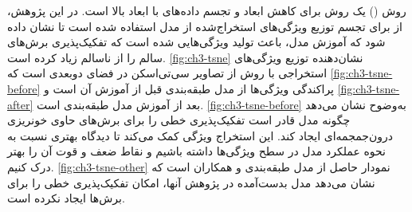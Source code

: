 روش
  ()
  یک روش برای کاهش ابعاد و تجسم داده‌های با ابعاد بالا است. در این پژوهش، از
    برای تجسم توزیع ویژگی‌های استخراج‌شده از مدل  
    استفاده شده است تا نشان داده شود که آموزش مدل، باعث تولید ویژگی‌هایی شده است که تفکیک‌پذیری برش‌های سالم را از ناسالم زیاد کرده است. 
     \autoref{fig:ch3-tsne}
 نشان‌دهنده توزیع ویژگی‌های استخراجی با روش 
  از تصاویر سی‌تی‌اسکن در فضای دو‌بعدی است که 
  \autoref{fig:ch3-tsne-before}
  پراکندگی ویژگی‌ها از مدل طبقه‌بندی قبل از آموزش آن است و 
    \autoref{fig:ch3-tsne-after}
    بعد از آموزش مدل طبقه‌بندی است. 
      \autoref{fig:ch3-tsne-before}
  به‌وضوح نشان می‌دهد چگونه مدل قادر است تفکیک‌پذیری خطی را برای برش‌های حاوی خونریزی درون‌جمجمه‌ای ایجاد کند. این استخراج ویژگی کمک می‌کند تا دیدگاه بهتری نسبت به نحوه عملکرد مدل در سطح ویژگی‌ها داشته باشیم و نقاط ضعف و قوت آن را بهتر درک کنیم. 
        \autoref{fig:ch3-tsne-other}
نمودار 
حاصل از مدل طبقه‌بندی 
\cite{Ganeshkumar2022Identification}
و همکاران است که نشان می‌دهد مدل بدست‌آمده در پژوهش آنها، امکان تفکیک‌پذیری خطی را برای برش‌ها ایجاد نکرده است.

